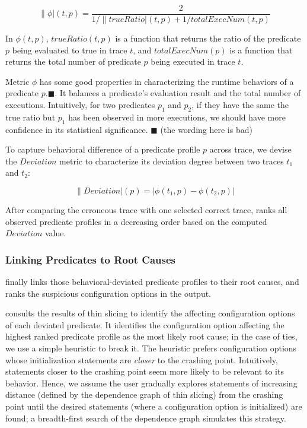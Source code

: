 \vspace{-3mm}

\[
\|\phi|(t, p) = \frac{2}{{1}/{\|trueRatio|(t, p)} + {1}/{totalExecNum(t, p)}}
\]

In $\phi(t, p)$, $trueRatio(t, p)$ is a function that returns the ratio of the predicate $p$ being
evaluated to true in trace $t$, and $totalExecNum(p)$ is a function
that returns the total number of predicate $p$ being executed in trace $t$.

Metric $\phi$ has some good properties in characterizing the
runtime behaviors of a predicate $p$.$\blacksquare$.
It balances a predicate's evaluation result and the total number of executions.
Intuitively, for two predicates $p_1$ and $p_2$, if they have the same
the true ratio but $p_1$ has been observed in more executions, we
should have more confidence in its statistical significance. $\blacksquare$
(the wording here is bad)

To capture behavioral difference of a predicate profile $p$
across trace, we devise the  $Deviation$ metric
to characterize its deviation degree between two traces $t_1$ and $t_2$:

\vspace{-3mm}

\[
\|Deviation|(p) = |\phi(t_1, p) - \phi(t_2, p)|
\]



After comparing the erroneous trace with one selected correct trace,
\ourtool ranks all observed predicate profiles in
a decreasing order based on the computed $Deviation$ value.






\subsubsection{Linking Predicates to Root Causes}
\label{sec:linking}


\ourtool finally links those behavioral-deviated
predicate profiles to their root causes, and ranks the suspicious
configuration options in the output.

\ourtool consults the results of thin slicing to identify
the affecting configuration options of each deviated predicate.
It identifies the configuration option
affecting the highest ranked predicate profile as the most likely
root cause; in the case of ties, we use a simple heuristic to break it.
The heuristic prefers configuration options whose initialization
statements are \textit{closer} to the
crashing point. Intuitively, statements closer to the
crashing point seem more likely to be relevant to its behavior.
Hence, we assume the user gradually explores statements of
increasing distance (defined by the dependence graph of thin slicing)
from the crashing point until the desired statements (where a configuration
option is initialized) are found; a breadth-first
search of the dependence graph simulates this strategy.


